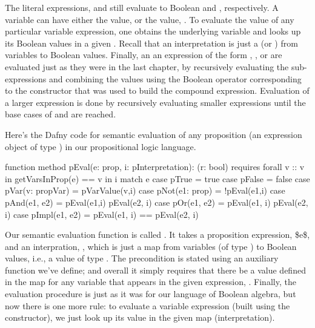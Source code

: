 \documentclass[letterpaper,10pt,english]{sphinxmanual}
\begin{document}
The literal expressions,  and  still evaluate to
Boolean  and , respectively. A variable can have either
the value,  or the value, . To evaluate the value of any
particular variable expression, one obtains the underlying variable
and looks up its Boolean values in a given .  Recall
that an interpretation is just a  (or ) from variables
to Boolean values. Finally, an an expression of the form ,
, or  are evaluated just as they were in the last
chapter, by recursively evaluating the sub-expressions and combining
the values using the Boolean operator corresponding to the constructor
that was used to build the compound expression. Evaluation of a larger
expression is done by recursively evaluating smaller expressions until
the base cases of  and  are reached.

Here’s the Dafny code for semantic evaluation of any proposition (an
expression object of type ) in our propositional logic language.

\begin{sphinxVerbatim}[commandchars=\\\{\}]
function method pEval(e: prop, i: pInterpretation): (r: bool)
     requires forall v :: v in getVarsInProp(e) ==\PYGZgt{} v in i
 \PYGZob{}
     match e
     \PYGZob{}
         case pTrue =\PYGZgt{} true
         case pFalse =\PYGZgt{} false
         case pVar(v: propVar) =\PYGZgt{} pVarValue(v,i)
         case pNot(e1: prop) =\PYGZgt{} !pEval(e1,i)
         case pAnd(e1, e2) =\PYGZgt{} pEval(e1,i) \PYGZam{}\PYGZam{} pEval(e2, i)
         case pOr(e1, e2) =\PYGZgt{}  pEval(e1, i) \textbar{}\textbar{} pEval(e2, i)
         case pImpl(e1, e2) =\PYGZgt{} pEval(e1, i) ==\PYGZgt{} pEval(e2, i)
     \PYGZcb{}
 \PYGZcb{}
\end{sphinxVerbatim}

Our semantic evaluation function is called . It takes a
proposition expression, \$e\$, and an interpration, , which is just a
map from variables (of type ) to Boolean values, i.e., a
value of type . The precondition is stated using an
auxiliary function we’ve define; and overall it simply requires that
there be a value defined in the map for any variable that appears in
the given expression, . Finally, the evaluation procedure is just
as it was for our language of Boolean algebra, but now there is one
more rule: to evaluate a variable expression (built using the
 constructor), we just look up its value in the given map
(interpretation).
\end{document}
